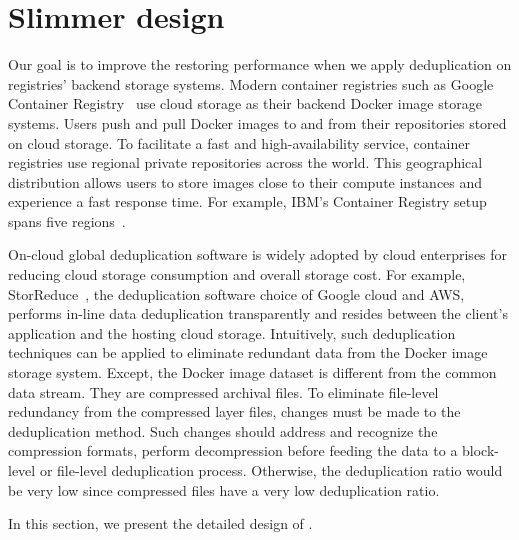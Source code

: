 \section{Slimmer design}
\label{sec:slimmer}

%



Our goal is to improve the restoring performance when we apply deduplication on registries' backend storage systems.
Modern container registries such as Google Container Registry~\cite{GoogleContainerRegistry} use cloud storage as their backend Docker image storage systems. Users push and pull Docker images to and from their repositories stored on cloud storage. To facilitate a fast and high-availability service, container registries use regional private repositories across the world.  This geographical distribution allows users to store images close to their compute instances and experience a fast response time. For example, IBM's Container Registry setup spans five regions~\cite{anwarfast}. 

On-cloud global deduplication software is widely adopted by cloud enterprises for reducing cloud storage consumption and overall storage cost. For example, StorReduce~\cite{storreduce_purestorage}, the deduplication software choice of Google cloud and AWS, performs in-line data deduplication transparently and resides between the client's application and the hosting cloud storage.
Intuitively, such deduplication techniques can be applied to eliminate redundant data from the Docker image storage system.  
Except, the Docker image dataset is different from the common data stream. They are compressed archival files.
To eliminate file-level redundancy from the compressed layer files, changes must be made to the deduplication method. Such changes should address and recognize the compression formats, perform decompression before feeding the data to a block-level or file-level deduplication process. Otherwise, the deduplication ratio would be very low since compressed files have a very low deduplication ratio. 

In this section, we present the detailed design of \sysname.








